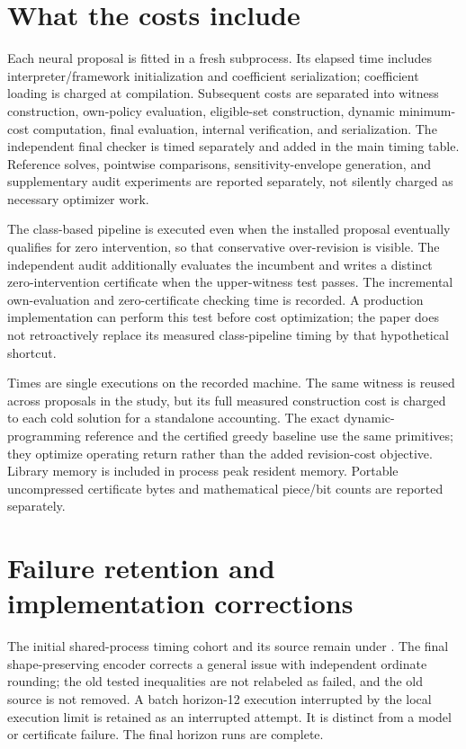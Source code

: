 \section{What the costs include}
Each neural proposal is fitted in a fresh subprocess. Its elapsed time includes interpreter/framework initialization and coefficient serialization; coefficient loading is charged at compilation. Subsequent costs are separated into witness construction, own-policy evaluation, eligible-set construction, dynamic minimum-cost computation, final evaluation, internal verification, and serialization. The independent final checker is timed separately and added in the main timing table. Reference solves, pointwise comparisons, sensitivity-envelope generation, and supplementary audit experiments are reported separately, not silently charged as necessary optimizer work.

The class-based pipeline is executed even when the installed proposal eventually qualifies for zero intervention, so that conservative over-revision is visible. The independent audit additionally evaluates the incumbent and writes a distinct zero-intervention certificate when the upper-witness test passes. The incremental own-evaluation and zero-certificate checking time is recorded. A production implementation can perform this test before cost optimization; the paper does not retroactively replace its measured class-pipeline timing by that hypothetical shortcut.

Times are single executions on the recorded machine. The same witness is reused across proposals in the study, but its full measured construction cost is charged to each cold solution for a standalone accounting. The exact dynamic-programming reference and the certified greedy baseline use the same primitives; they optimize operating return rather than the added revision-cost objective. Library memory is included in process peak resident memory. Portable uncompressed certificate bytes and mathematical piece/bit counts are reported separately.

\section{Failure retention and implementation corrections}
The initial shared-process timing cohort and its source remain under . The final shape-preserving encoder corrects a general issue with independent ordinate rounding; the old tested inequalities are not relabeled as failed, and the old source is not removed. A batch horizon-12 execution interrupted by the local execution limit is retained as an interrupted attempt. It is distinct from a model or certificate failure. The final horizon runs are complete.

